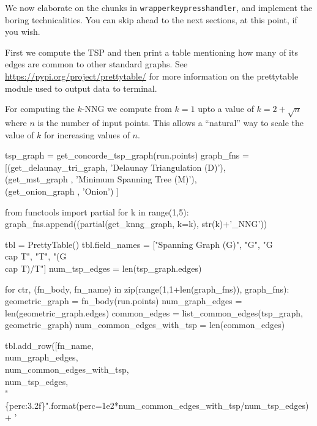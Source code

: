 We now elaborate on the chunks in \verb|wrapperkeypresshandler|, and implement the boring technicalities. You 
can skip ahead to the next sections, at this point, if you wish. 

First we compute the TSP and then print a table mentioning how many of its edges are common to other
standard graphs. See \url{https://pypi.org/project/prettytable/} for more information on the 
prettytable module used to output data to terminal. 

For computing the $k$-NNG we compute from $k=1$ upto a value of $k=2+\sqrt{n}$ where $n$ is the number 
of input points. This allows a ``natural'' way to scale the value of $k$ for increasing values of $n$. 

\nwenddocs{}\endmoddef\nwstartdeflinemarkup{}\nwenddeflinemarkup
tsp_graph = get_concorde_tsp_graph(run.points)
graph_fns = [(get_delaunay_tri_graph, 'Delaunay Triangulation (D)'), \\
             (get_mst_graph         , 'Minimum Spanning Tree (M)'), \\
             (get_onion_graph       , 'Onion') ]

from functools import partial
for k in range(1,5): 
   graph_fns.append((partial(get_knng_graph, k=k), str(k)+'_NNG'))

tbl             = PrettyTable()
tbl.field_names = ["Spanning Graph (G)", "G", "G \\cap T", "T", "(G \\cap T)/T"]
num_tsp_edges   = len(tsp_graph.edges)

for ctr, (fn_body, fn_name) in zip(range(1,1+len(graph_fns)), graph_fns):
     geometric_graph = fn_body(run.points)
     num_graph_edges = len(geometric_graph.edges)
     common_edges    = list_common_edges(tsp_graph, geometric_graph)
     num_common_edges_with_tsp = len(common_edges)

     tbl.add_row([fn_name,                 \\
                num_graph_edges,           \\
                num_common_edges_with_tsp, \\
                num_tsp_edges,             \\
                "\{perc:3.2f\}".format(perc=1e2*num_common_edges_with_tsp/num_tsp_edges)+ ' %
                
